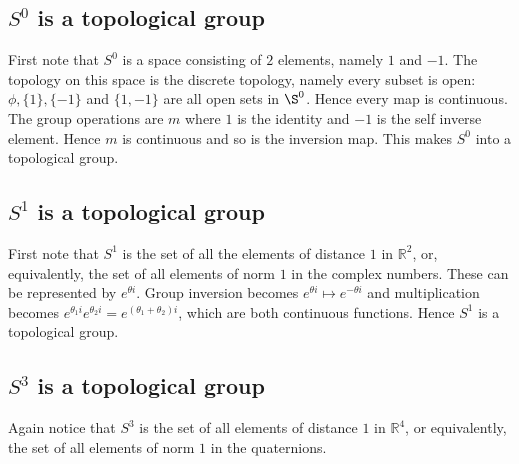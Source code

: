 \documentclass[../Thesis.tex]{subfiles}
\begin{document}
\subsection{$S^0$ is a topological group}
First note that $S^0$ is a space consisting of $2$ elements, namely $1$ and $-1$. The topology on this space is the discrete topology, namely every subset is open: $\phi, \{1\}, \{-1\}$ and $\{1, -1\}$ are all open sets in $\S^0$. Hence every map is continuous. The group operations are $m$ where $1$ is the identity and $-1$ is the self inverse element. Hence $m$ is continuous and so is the inversion map. This makes $S^0$ into a topological group.
\subsection{$S^1$ is a topological group}
First note that $S^1$ is the set of all the elements of distance $1$ in $\mathbb{R}^2$, or, equivalently, the set of all elements of norm $1$ in the complex numbers. These can be represented by $e^{\theta i}$. Group inversion becomes $e^{\theta i} \mapsto e^{-\theta i}$ and multiplication becomes $e^{\theta_1 i} e^{\theta_2 i} = e^{(\theta_1 + \theta_2)i}$, which are both continuous functions. Hence $S^1$ is a topological group.
\subsection{$S^3$ is a topological group}
Again notice that $S^3$ is the set of all elements of distance $1$ in $\mathbb{R}^4$, or equivalently, the set of all elements of norm $1$ in the quaternions.
\end{document}
